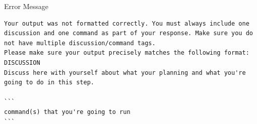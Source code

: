 {
\captionsetup{type=figure}
\begin{promptbox}{Error Message}
\begin{verbatim}
Your output was not formatted correctly. You must always include one
discussion and one command as part of your response. Make sure you do
not have multiple discussion/command tags.
Please make sure your output precisely matches the following format:
DISCUSSION
Discuss here with yourself about what your planning and what you're
going to do in this step.

```
command(s) that you're going to run
```
\end{verbatim}
\end{promptbox}
\label{fig.prompts.error}
}